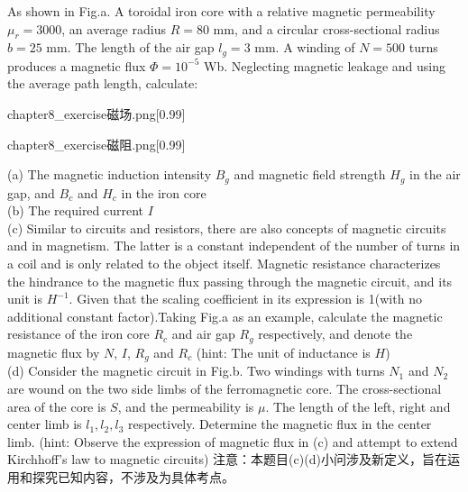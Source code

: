 \begin{solution}
    As shown in Fig.a. A toroidal iron core with a relative magnetic permeability $\mu_r = 3000$, an average radius \( R = 80 \) mm, and a circular cross-sectional 
    radius \( b = 25 \) mm. The length of the air gap \( l_g = 3 \) mm. A winding of $N=500$ turns produces a magnetic flux \(\Phi =  10^{-5} \) Wb. 
    Neglecting magnetic leakage and using the average path length, calculate:
    \begin{minipage}{0.45\textwidth}
        \centering
        \begin{singlefigure}[a]{chapter8_exercise磁场.png}[0.99]
        \end{singlefigure}
    \end{minipage}
    \begin{minipage}{0.45\textwidth}
        \centering
        \begin{singlefigure}[b]{chapter8_exercise磁阻.png}[0.99]
        \end{singlefigure}
    \end{minipage}
    
    (a) The magnetic induction intensity \( B_g \) and magnetic field strength \( H_g \) in the air gap, and \( B_c \) and \( H_c \) in the iron core\\
    (b) The required current \( I \)\\
    (c) Similar to circuits and resistors, there are also concepts of magnetic circuits and  in magnetism. The latter is a constant 
    independent of the number of turns in a coil and is only related to the object itself. Magnetic resistance characterizes the hindrance to the magnetic flux passing through the magnetic 
    circuit, and its unit is $H^{-1}$. Given that the scaling coefficient in its expression is 1(with no additional constant factor).Taking Fig.a as an example, calculate the magnetic 
    resistance of the iron core \( R_c \) and air gap \( R_g \) respectively, and denote the magnetic flux by $N$, $I$, $R_g$ and $R_c$
    (hint: The unit of inductance is $H$)\\
    (d) Consider the magnetic circuit in Fig.b. Two windings with turns $N_1$ and $N_2$ are wound on the two side limbs of the ferromagnetic core. The cross-sectional area of the 
    core is $S$, and the permeability is $\mu$. The length of the left, right and center limb is \(l_1, l_2, l_3\) respectively. Determine the magnetic flux in the center limb.
    (hint: Observe the expression of magnetic flux in (c) and attempt to extend Kirchhoff's law to magnetic circuits)
    \tcbrule
    注意：本题目(c)(d)小问涉及新定义，旨在运用和探究已知内容，不涉及为具体考点。


\end{solution}
